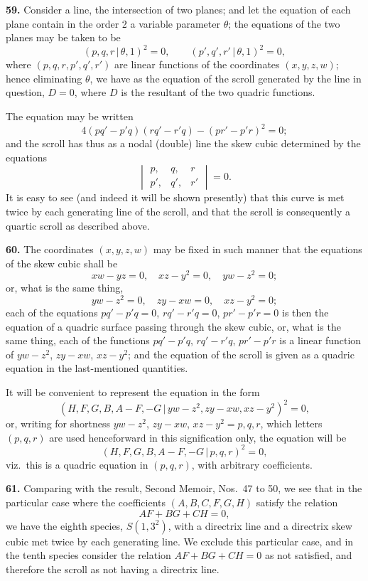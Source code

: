 \documentclass[11pt,a4paper]{article}
\begin{document}
\textbf{59.} Consider a line, the intersection of two planes; and let the equation of each plane contain in the order 2 a variable parameter $\theta$; the equations of the two planes may be taken to be
\[
(p, q, r \,\vert\, \theta, 1)^2 = 0, \qquad (p', q', r' \,\vert\, \theta, 1)^2 = 0,
\]
where $(p, q, r, p', q', r')$ are linear functions of the coordinates $(x, y, z, w)$; hence eliminating $\theta$, we have as the equation of the scroll generated by the line in question, $D=0$, where $D$ is the resultant of the two quadric functions.

The equation may be written
\[
4(pq' - p'q)(rq' - r'q) - (pr' - p'r)^2 = 0;
\]
and the scroll has thus as a nodal (double) line the skew cubic determined by the equations
\[
\begin{vmatrix}
p, & q, & r \\
p', & q', & r'
\end{vmatrix} = 0.
\]
It is easy to see (and indeed it will be shown presently) that this curve is met twice by each generating line of the scroll, and that the scroll is consequently a quartic scroll as described above.

\textbf{60.} The coordinates $(x, y, z, w)$ may be fixed in such manner that the equations of the skew cubic shall be
\[
xw - yz = 0, \quad xz - y^2 = 0, \quad yw - z^2 = 0;
\]
or, what is the same thing,
\[
yw - z^2 = 0, \quad zy - xw = 0, \quad xz - y^2 = 0;
\]
each of the equations $pq' - p'q = 0$, $rq' - r'q = 0$, $pr' - p'r = 0$ is then the equation of a quadric surface passing through the skew cubic, or, what is the same thing, each of the functions $pq' - p'q$, $rq' - r'q$, $pr' - p'r$ is a linear function of $yw - z^2$, $zy - xw$, $xz - y^2$; and the equation of the scroll is given as a quadric equation in the last-mentioned quantities.

It will be convenient to represent the equation in the form
\[
(H, F, G, B, A-F, -G \,\vert\, yw - z^2, zy - xw, xz - y^2)^2 = 0,
\]
or, writing for shortness $yw - z^2$, $zy - xw$, $xz - y^2 = p, q, r$, which letters $(p, q, r)$ are used henceforward in this signification only, the equation will be
\[
(H, F, G, B, A-F, -G \,\vert\, p, q, r)^2 = 0,
\]
viz.\ this is a quadric equation in $(p, q, r)$, with arbitrary coefficients.

\textbf{61.} Comparing with the result, Second Memoir, Nos.~47 to 50, we see that in the particular case where the coefficients $(A, B, C, F, G, H)$ satisfy the relation
\[
AF + BG + CH = 0,
\]
we have the eighth species, $S(1, 3^2)$, with a directrix line and a directrix skew cubic met twice by each generating line. We exclude this particular case, and in the tenth species consider the relation $AF + BG + CH = 0$ as not satisfied, and therefore the scroll as not having a directrix line.
\end{document}
